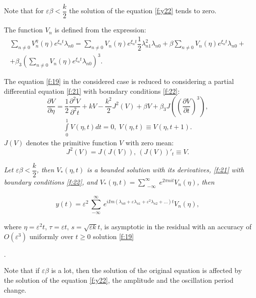\documentclass[12pt]{article} %
\newcommand{\eps}{\varepsilon}
\begin{document}
Note that for $\eps\beta<\dfrac{k}{2}$ the solution of the equation \eqref{f:y22} tends to zero.


The function $V_n$ is defined from the expression:
\begin{equation*} 
\begin{array}{c}
\sum\limits_{n\neq0}V_n^{\eta}(\eta)e^{\xi_nt}\lambda_{n0}=\sum\limits_{n\neq0}V_n(\eta)e^{\xi_nt}\dfrac{1}{2}\lambda_{n1}^2\lambda_{n0}+\beta\sum\limits_{n\neq0}V_n(\eta)e^{\xi_nt}\lambda_{n0}+\\
+\beta_3(\sum\limits_{n\neq0}V_n(\eta)e^{\xi_nt}\lambda_{n0})^3.
\end{array}
\end{equation*}


The equation \eqref{f:19} in the considered case is reduced to considering a partial differential equation \eqref{f:21} with boundary conditions \eqref{f:22}:
\begin{equation}
\displaystyle\frac{\partial V}{\partial \eta}=\frac{1}{2}\frac{\partial^2 V}{\partial^2 t}+kV-\frac{k^2}{2}J^2(V)+\beta V+ \beta_3J\left(\left(\frac{\partial V}{\partial t}\right)^3\right),
\label{f:21}
\end{equation}
\begin{equation}
\begin{array}{cc}
\int\limits_0^1V(\eta,t)dt=0,\;
V(\eta,t) \equiv V(\eta,t+1).
\end{array}
\label{f:22}
\end{equation}
\noindent $J(V)$ denotes the primitive function $V$ with zero mean:
\[
J^2(V)=J(J(V)),\,(J(V))'_t\equiv V.
\]






 {\sl Let $\eps\beta<\dfrac{k}{2}$, then \(V_*(\eta,t)\) is a bounded solution with its derivatives, \eqref{f:21} with boundary conditions \eqref{f:22}, and \(V_*(\eta,t)=\sum\limits_{\substack{ -\infty}}^\infty e^ {2\pi n i t}V_n(\eta)\), then

\[
y(t)=\eps^2\sum\limits_{\substack{ -\infty }}^\infty e^{iIm(\lambda_{n0}+ \varepsilon\lambda_{n1}+\varepsilon^{2}\lambda_{n2}+\ldots) t}V_n(\eta),
\]

\noindent where $\eta=\eps^2 t$, $\tau=\eps t$, $s=\sqrt{\eps k}t$, is asymptotic in the residual with an accuracy of $O(\eps^3)$ uniformly over \(t\geq 0\) solution \eqref{f:19}}.

Note that if $\eps\beta$ is a lot, then the solution of the original equation is affected by the solution of the equation \eqref{f:y22}, the amplitude and the oscillation period change.
\end{document}
